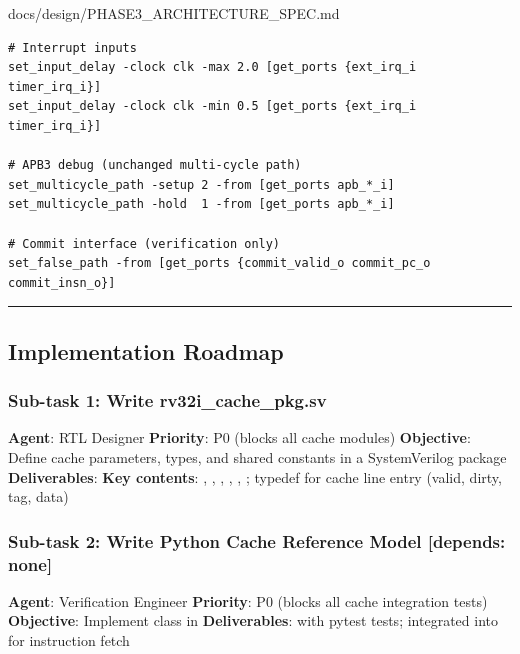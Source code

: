 \begin{relocated}{docs/design/PHASE3_ARCHITECTURE_SPEC.md}
\begin{lstlisting}[language={}]
# Interrupt inputs
set_input_delay -clock clk -max 2.0 [get_ports {ext_irq_i timer_irq_i}]
set_input_delay -clock clk -min 0.5 [get_ports {ext_irq_i timer_irq_i}]

# APB3 debug (unchanged multi-cycle path)
set_multicycle_path -setup 2 -from [get_ports apb_*_i]
set_multicycle_path -hold  1 -from [get_ports apb_*_i]

# Commit interface (verification only)
set_false_path -from [get_ports {commit_valid_o commit_pc_o commit_insn_o}]
\end{lstlisting}

\begin{center}\rule{0.5\linewidth}{0.5pt}\end{center}

\subsection{Implementation Roadmap}\label{ds:ch:phase3-architecture:11-implementation-roadmap}

\subsubsection{\texorpdfstring{Sub-task 1: Write
rv32i\_\allowbreak{}cache\_\allowbreak{}pkg.sv}{Sub-task 1: Write rv32i\_cache\_pkg.sv}}\label{ds:ch:phase3-architecture:sub-task-1-write-rv32i-cache-pkgsv}

\textbf{Agent}: RTL Designer \textbf{Priority}: P0 (blocks all cache
modules) \textbf{Objective}: Define cache parameters, types, and shared
constants in a SystemVerilog package \textbf{Deliverables}:
 \textbf{Key contents}:
, , , ,
, ; typedef for cache line entry
(valid, dirty, tag, data)

\subsubsection{Sub-task 2: Write Python Cache Reference Model
{[}depends: none{]}}\label{ds:ch:phase3-architecture:sub-task-2-write-python-cache-reference-model-depends-none}

\textbf{Agent}: Verification Engineer \textbf{Priority}: P0 (blocks all
cache integration tests) \textbf{Objective}: Implement
 class in 
\textbf{Deliverables}:  with pytest tests;
integrated into  for instruction fetch


\end{relocated}
